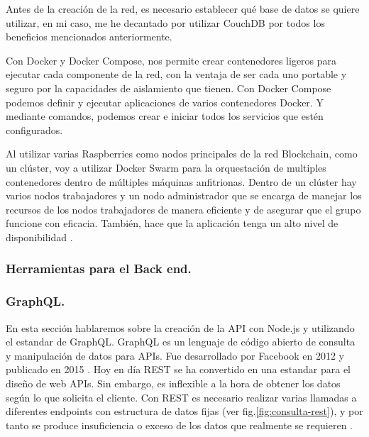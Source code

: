 \vspace{5mm}

\noindent Antes de la creación de la red, es necesario establecer qué base de datos se quiere utilizar, en mi caso, me 
he decantado por utilizar CouchDB por todos los beneficios mencionados anteriormente.

\vspace{5mm}

\noindent Con Docker y Docker Compose, nos permite crear contenedores ligeros para ejecutar cada componente de la red, 
con la ventaja de ser cada uno portable y seguro por la capacidades de aislamiento que tienen. Con Docker Compose 
podemos definir y ejecutar aplicaciones de varios contenedores Docker. Y mediante comandos, podemos crear e iniciar 
todos los servicios que estén configurados.

\vspace{5mm}

\noindent Al utilizar varias Raspberries como nodos principales de la red Blockchain, como un clúster, voy a utilizar 
Docker Swarm para la orquestación de multiples contenedores dentro de múltiples máquinas anfitrionas. Dentro de un 
clúster hay varios nodos trabajadores y un nodo administrador que se encarga de manejar los recursos de los nodos 
trabajadores de manera eficiente y de asegurar que el grupo funcione con eficacia. También, hace que la aplicación 
tenga un alto nivel de disponibilidad \cite{what-is-docker-swarm}.

\subsubsection{Herramientas para el Back end.}

\subsubsection*{GraphQL.}

En esta sección hablaremos sobre la creación de la API con Node.js y utilizando el estandar de GraphQL. GraphQL es un 
lenguaje de código abierto de consulta y manipulación de datos para APIs. Fue desarrollado por Facebook en 2012 y 
publicado en 2015 \cite{graphql}. Hoy en día REST se ha convertido en una estandar para el diseño de web APIs. Sin 
embargo, es inflexible a la hora de obtener los datos según lo que solicita el cliente. Con REST es necesario realizar 
varias llamadas a diferentes endpoints con estructura de datos fijas (ver fig.\ref{fig:consulta-rest}), y por tanto se 
produce insuficiencia o exceso de los datos que realmente se requieren \cite{graphql-vs-rest}. 


